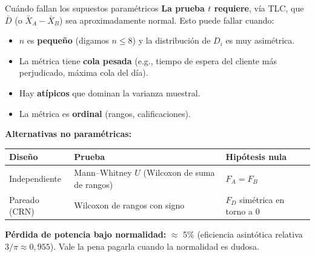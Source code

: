 \documentclass[aspectratio=1610, 10pt]{beamer}
\begin{document}
\begin{frame}{Cuándo fallan los supuestos paramétricos}
\textbf{La prueba $t$ requiere}, vía TLC, que $\bar D$ (o $\bar X_A - \bar X_B$) sea aproximadamente normal. Esto puede fallar cuando:
\begin{itemize}
\item $n$ es \textbf{pequeño} (digamos $n \le 8$) y la distribución de $D_i$ es muy asimétrica.
\item La métrica tiene \textbf{cola pesada} (e.g., tiempo de espera del cliente más perjudicado, máxima cola del día).
\item Hay \textbf{atípicos} que dominan la varianza muestral.
\item La métrica es \textbf{ordinal} (rangos, calificaciones).
\end{itemize}

\vspace{0.3cm}
\textbf{Alternativas no paramétricas:}
\begin{table}
\centering
\small
\begin{tabular}{lll}
\toprule
\textbf{Diseño} & \textbf{Prueba} & \textbf{Hipótesis nula} \\
\midrule
Independiente & Mann--Whitney $U$ (Wilcoxon de suma de rangos) & $F_A = F_B$ \\
Pareado (CRN) & Wilcoxon de rangos con signo & $F_D$ simétrica en torno a 0 \\
\bottomrule
\end{tabular}
\end{table}

\textbf{Pérdida de potencia bajo normalidad:} $\approx$ 5\% (eficiencia asintótica relativa $3/\pi \approx 0{,}955$). Vale la pena pagarla cuando la normalidad es dudosa.
\end{frame}
\end{document}

